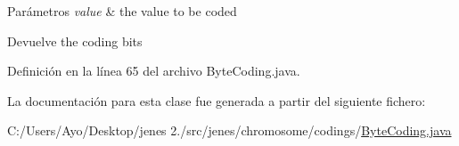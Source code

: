 \begin{DoxyParams}{Parámetros}
{\em value} & the value to be coded \\
\hline
\end{DoxyParams}
\begin{DoxyReturn}{Devuelve}
the coding bits 
\end{DoxyReturn}


Definición en la línea 65 del archivo Byte\-Coding.\-java.



La documentación para esta clase fue generada a partir del siguiente fichero\-:\begin{DoxyCompactItemize}
\item 
C\-:/\-Users/\-Ayo/\-Desktop/jenes 2./src/jenes/chromosome/codings/\hyperlink{_byte_coding_8java}{Byte\-Coding.\-java}\end{DoxyCompactItemize}
